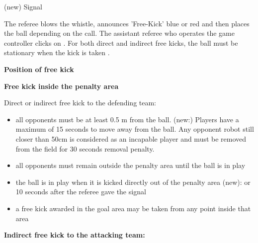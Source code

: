 \headlinebox

(new) Signal

The referee blows the whistle, announces 'Free-Kick'  blue or red and then places the ball depending on the call. The assistant referee who operates the game controller clicks on  . 
For both direct and indirect free kicks, the ball must be stationary when the kick is taken 
.

\bigskip

{\bfseries Position of free kick }

\headlinebox

\textbf{Free kick inside the penalty area}

Direct or indirect free kick to the defending team:
\begin{itemize}
\item all opponents must be at least 0.5 m from the ball. (new:) Players have a maximum of 15 seconds to move away from the ball. Any opponent robot still closer than 50cm is considered as an incapable player and must be removed from the field for 30 seconds removal penalty.
\item all opponents must remain outside the penalty area until the ball is in play
\item the ball is in play when it is kicked directly out of the penalty area (new): or 10 seconds after the referee gave the signal
\item a free kick awarded in the goal area may be taken from any point inside that area
\end{itemize}

\bigskip

\textbf{Indirect free kick to the attacking team:}

